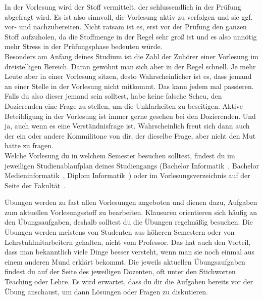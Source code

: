 
In der Vorlesung wird der Stoff vermittelt, der schlussendlich in der Prüfung abgefragt wird. 
Es ist also sinnvoll, die Vorlesung aktiv zu verfolgen und sie ggf. vor- und nachzubereiten. 
Nicht ratsam ist es, erst vor der Prüfung den ganzen Stoff aufzuholen, da die Stoffmenge in der Regel sehr groß ist und es also unnötig mehr Stress in der Prüfungsphase bedeuten würde. \\
Besonders am Anfang deines Studium ist die Zahl der Zuhörer einer Vorlesung im dreistelligen Bereich. 
Daran gewöhnt man sich aber in der Regel schnell.
Je mehr Leute aber in einer Vorlesung sitzen, desto Wahrscheinlicher ist es, dass jemand an einer Stelle in der Vorlesung nicht mitkommt. 
Das kann jedem mal passieren.
Falls du also dieser jemand sein solltest, habe keine falsche Scheu, den Dozierenden eine Frage zu stellen, um die Unklarheiten zu beseitigen. 
Aktive Beteildigung in der Vorlesung ist immer gerne gesehen bei den Dozierenden.
Und ja, auch wenn es eine Verständnisfrage ist. 
Wahrscheinlich freut sich dann auch der ein oder andere Kommilitone von dir, der dieselbe Frage, aber nicht den Mut hatte zu fragen. \\
Welche Vorlesung du in welchem Semester besuchen solltest, findest du im jeweiligen Studienablaufplan deines Studiengangs
(Bachelor Informatik~, Bachelor Medieninformatik~, Diplom Informatik~) oder im Vorlesungsverzeichnis auf der Seite der Fakultät~. 



Übungen werden zu fast allen Vorlesungen angeboten und dienen dazu, Aufgaben zum aktuellen Vorlesungsstoff zu bearbeiten. Klausuren orientieren sich häufig an den Übungsaufgaben, deshalb solltest du die Übungen
regelmäßig besuchen. Die Übungen werden meistens von Studenten aus höheren Semestern oder von Lehrstuhlmitarbeitern gehalten, nicht vom Professor.
Das hat auch den Vorteil, dass man bekanntlich viele Dinge besser versteht, wenn man sie noch einmal aus einem anderen Mund erklärt bekommt.
Die jeweils aktuellen Übungsaufgaben findest du auf der Seite des jeweiligen Dozenten, oft unter den Stichworten Teaching oder Lehre.
Es wird erwartet, dass du dir die Aufgaben bereits vor der Übung anschaust, um dann Lösungen oder Fragen zu diskutieren.


